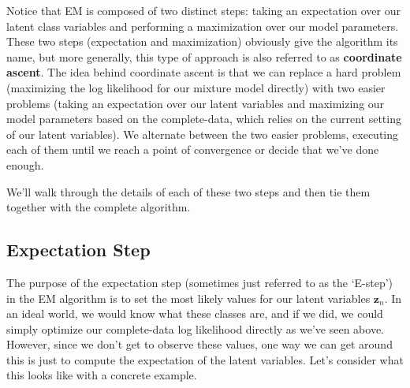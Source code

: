 Notice that EM is composed of two distinct steps: taking an expectation over our latent class variables and performing a maximization over our model parameters. These two steps (expectation and maximization) obviously give the algorithm its name, but more generally, this type of approach is also referred to as \textbf{coordinate ascent}. The idea behind coordinate ascent is that we can replace a hard problem (maximizing the log likelihood for our mixture model directly) with two easier problems (taking an expectation over our latent variables and maximizing our model parameters based on the complete-data, which relies on the current setting of our latent variables). We alternate between the two easier problems, executing each of them until we reach a point of convergence or decide that we've done enough.

We'll walk through the details of each of these two steps and then tie them together with the complete algorithm.

\subsection{Expectation Step}
The purpose of the expectation step (sometimes just referred to as the `E-step') in the EM algorithm is to set the most likely values for our latent variables $\textbf{z}_n$. In an ideal world, we would know what these classes are, and if we did, we could simply optimize our complete-data log likelihood directly as we've seen above. However, since we don't get to observe these values, one way we can get around this is just to compute the expectation of the latent variables. Let's consider what this looks like with a concrete example.


